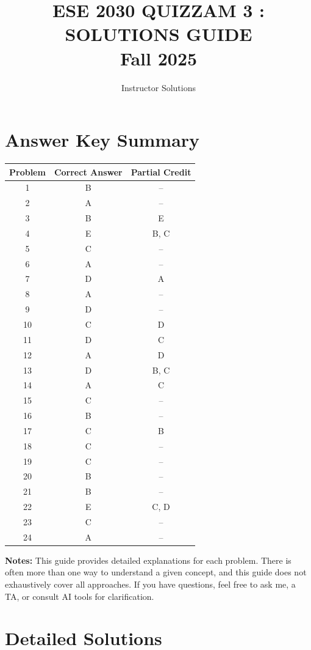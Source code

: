 \documentclass[12pt]{amsart}
\title{ESE 2030 QUIZZAM 3 : SOLUTIONS GUIDE\\Fall 2025}
\author{Instructor Solutions}
\begin{document}
\maketitle

\section*{Answer Key Summary}
\begin{center}
\begin{tabular}{|c|c|c|}
\hline
Problem & Correct Answer & Partial Credit \\
\hline
1 & B & -- \\
2 & A & -- \\
3 & B & E \\
4 & E & B, C \\
5 & C & -- \\
6 & A & -- \\
7 & D & A \\
8 & A & -- \\
9 & D & -- \\
10 & C & D \\
11 & D & C \\
12 & A & D \\
13 & D & B, C \\
14 & A & C \\
15 & C & -- \\
16 & B & -- \\
17 & C & B \\
18 & C & -- \\
19 & C & -- \\
20 & B & -- \\
21 & B & -- \\
22 & E & C, D \\
23 & C & -- \\
24 & A & -- \\
\hline
\end{tabular}
\end{center}

\textbf{Notes:} This guide provides detailed explanations for each problem. There is often more than one way to understand a given concept, and this guide does not exhaustively cover all approaches. If you have questions, feel free to ask me, a TA, or consult AI tools for clarification.

\newpage

\section*{Detailed Solutions}
\end{document}
